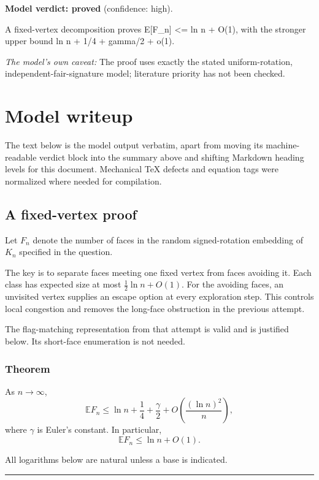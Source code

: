 \documentclass[
  11pt,
  a4paper,
]{article}
\begin{document}
\textbf{Model verdict: proved} (confidence: high).

A fixed-vertex decomposition proves E{[}F\_n{]} \textless= ln n + O(1),
with the stronger upper bound ln n + 1/4 + gamma/2 + o(1).

\emph{The model's own caveat:} The proof uses exactly the stated
uniform-rotation, independent-fair-signature model; literature priority
has not been checked.

\section{Model writeup}\label{model-writeup}

The text below is the model output verbatim, apart from moving its
machine-readable verdict block into the summary above and shifting
Markdown heading levels for this document. Mechanical TeX defects and
equation tags were normalized where needed for compilation.

\subsection{A fixed-vertex proof}\label{a-fixed-vertex-proof}

Let \(F_n\) denote the number of faces in the random signed-rotation
embedding of \(K_n\) specified in the question.

The key is to separate faces meeting one fixed vertex from faces
avoiding it. Each class has expected size at most \(\frac12\ln n+O(1)\).
For the avoiding faces, an unvisited vertex supplies an escape option at
every exploration step. This controls local congestion and removes the
long-face obstruction in the previous attempt.

The flag-matching representation from that attempt is valid and is
justified below. Its short-face enumeration is not needed.

\subsubsection{Theorem}\label{theorem}

As \(n\to\infty\), \[
\boxed{
\mathbb E F_n
\le
\ln n+\frac14+\frac{\gamma}{2}
+O\!\left(\frac{(\ln n)^2}{n}\right),
}
\] where \(\gamma\) is Euler's constant. In particular, \[
\mathbb E F_n\le \ln n+O(1).
\]

All logarithms below are natural unless a base is indicated.

\begin{center}\rule{0.5\linewidth}{0.5pt}\end{center}
\end{document}
